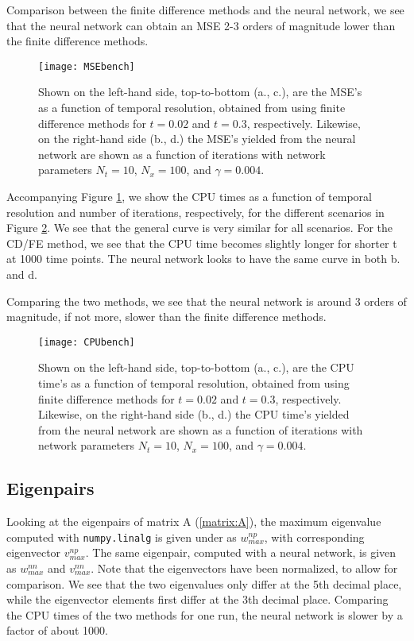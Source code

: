 Comparison between the finite difference methods and the neural network, we see that the neural network can obtain an MSE 2-3 orders of magnitude lower than the finite difference methods.
\begin{figure}[htbp]
 	\centering
 	\texttt{[image: MSEbench]}
  \caption{Shown on the left-hand side, top-to-bottom (a., c.), are the MSE's as a function of temporal resolution, obtained from using finite difference methods for $t=0.02$ and $t=0.3$, respectively. Likewise, on the right-hand side (b., d.) the MSE's yielded from the neural network are shown as a function of iterations with network parameters $N_t = 10$, $N_x = 100$, and $\gamma = 0.004$.}
  \label{fig:MSEbench}
\end{figure}

Accompanying Figure \ref{fig:MSEbench}, we show the CPU times as a function of temporal resolution and number of iterations, respectively, for the different scenarios in Figure \ref{fig:CPUbench}. We see that the general curve is very similar for all scenarios. For the CD/FE method, we see that the CPU time becomes slightly longer for shorter t at 1000 time points. The neural network looks to have the same curve in both b. and d.

Comparing the two methods, we see that the neural network is around 3 orders of magnitude, if not more, slower than the finite difference methods.
\begin{figure}[htbp]
 	\centering
 	\texttt{[image: CPUbench]}
 	\caption{Shown on the left-hand side, top-to-bottom (a., c.), are the CPU time's as a function of temporal resolution, obtained from using finite difference methods for $t=0.02$ and $t=0.3$, respectively. Likewise, on the right-hand side (b., d.) the CPU time's yielded from the neural network are shown as a function of iterations with network parameters $N_t = 10$, $N_x = 100$, and $\gamma = 0.004$.}
  \label{fig:CPUbench}
\end{figure}


\subsection{Eigenpairs}
Looking at the eigenpairs of matrix A (\ref{matrix:A}), the maximum eigenvalue computed with  \texttt{numpy.linalg} is given under as $w_{max}^{np}$, with corresponding eigenvector $v_{max}^{np}$. The same eigenpair, computed with a neural network, is given as $w_{max}^{nn}$ and $v_{max}^{nn}$. Note that the eigenvectors have been normalized, to allow for comparison. We see that the two eigenvalues only differ at the 5th decimal place, while the eigenvector elements first differ at the 3th decimal place. Comparing the CPU times of the two methods for one run, the neural network is slower by a factor of about 1000.  

